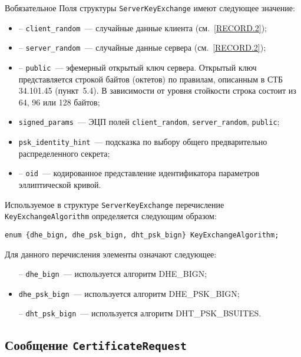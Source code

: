 \begin{appendix}{В}{обязательное}
Поля структуры \lstinline{ServerKeyExchange} имеют следующее значение:
\begin{itemize}
\item [--]
\lstinline{client_random}~--- случайные данные клиента (см.~\ref{RECORD.2});

\item [--]
\lstinline{server_random}~--- случайные данные сервера (см.~\ref{RECORD.2});

\item [--]
\lstinline{public}~--- эфемерный открытый ключ сервера. Открытый ключ 
представляется строкой байтов (октетов) по правилам, описанным в СТБ~
34.101.45 (пункт~5.4). В зависимости от уровня стойкости строка состоит из 
64, 96 или 128 байтов; 

\item [--]
\lstinline{signed_params}~--- ЭЦП полей \lstinline{client_random}, 
\lstinline{server_random}, \lstinline{public}; 

\item [--]
\lstinline{psk_identity_hint}~--- подсказка по выбору общего 
предварительно распределенного секрета; 

\item [--]
\lstinline{oid}~--- кодированное представление идентификатора параметров 
эллиптической кривой. 
\end{itemize}

Используемое в структуре \lstinline{ServerKeyExchange} перечисление 
\lstinline{KeyExchangeAlgorithm} определяется следующим образом: 
\begin{lstlisting}
enum {dhe_bign, dhe_psk_bign, dht_psk_bign} KeyExchangeAlgorithm;
\end{lstlisting}

Для данного перечисления элементы означают следующее:
\begin{itemize}
\item[--]
\lstinline{dhe_bign}~--- используется алгоритм DHE\_BIGN;

\item[--]
\lstinline{dhe_psk_bign}~--- используется алгоритм DHE\_PSK\_BIGN;

\item[--]
\lstinline{dht_psk_bign}~--- используется алгоритм DHT\_PSK\_BSUITES.
\end{itemize}

\subsection{Сообщение \lstinline{CertificateRequest}}\label{BSUITES.4.5} 


\end{appendix}
